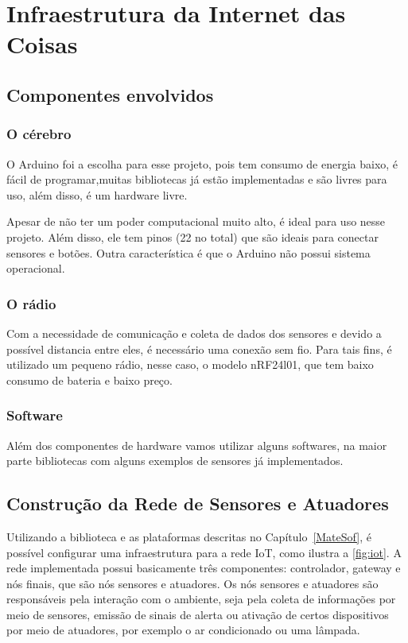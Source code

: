 %
\chapter{Infraestrutura da Internet das Coisas}


\section{Componentes envolvidos}

\subsection{O cérebro}

O Arduino foi a escolha para esse projeto, pois tem consumo de energia baixo, é fácil de programar,muitas bibliotecas já estão implementadas e são livres para uso, além disso, é um hardware livre. 

Apesar de não ter um poder computacional muito alto, é ideal para uso nesse projeto. Além disso, ele tem pinos (22 no total) que são ideais para conectar sensores e botões. Outra característica é que o Arduino não possui sistema operacional.

\subsection{O rádio}

Com a necessidade de comunicação e coleta de dados dos sensores e devido a possível distancia entre eles, é necessário uma conexão sem fio. Para tais fins, é utilizado um pequeno rádio, nesse caso, o modelo nRF24l01, que tem baixo consumo de bateria e baixo preço.

\subsection{Software}

Além dos componentes de hardware vamos utilizar alguns softwares, na maior parte bibliotecas com alguns exemplos de sensores já implementados. 

\section{Construção da Rede de Sensores e Atuadores}

Utilizando a biblioteca e as plataformas descritas no Capítulo~\ref{MateSof}, é possível configurar uma infraestrutura para a rede IoT, como ilustra a \ref{fig:iot}. A rede implementada possui
basicamente três componentes:
controlador, gateway e nós finais, que são nós sensores e atuadores. Os nós sensores e atuadores são responsáveis
pela interação com o ambiente, seja pela coleta de informações por meio de sensores, emissão de sinais de alerta ou ativação de certos dispositivos por meio de atuadores, por
exemplo o ar condicionado ou uma lâmpada.

